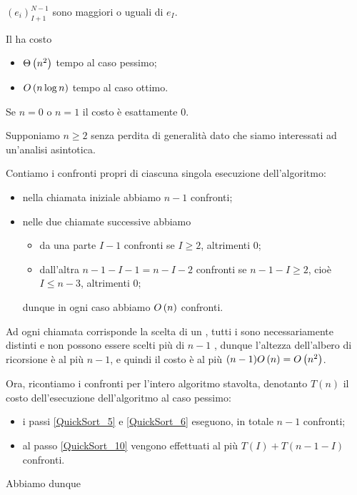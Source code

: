 $(e_i)_{I + 1}^{N - 1}$
sono maggiori o uguali di $e_I$. \EndProof
\begin{Theorem}
  \label{AlgoritmiEStruttureDiDati_CostoQuickSortDeterministico}
	Il  ha costo
  \begin{itemize}
    \item $\Theta \left ( n^2 \right )$ tempo al caso
      pessimo;
    \item $O \left ( n \log n \right )$ tempo al caso
      ottimo.
  \end{itemize}
\end{Theorem}
\Proof Se $n = 0$ o $n = 1$ il costo \`e esattamente $0$.
\par Supponiamo $n \geq 2$ senza perdita di generalit\`a dato che
siamo interessati ad un'analisi asintotica.
\par Contiamo i confronti propri di ciascuna singola esecuzione dell'algoritmo:
\begin{itemize}
  \item nella chiamata iniziale abbiamo $n - 1$ confronti;
  \item nelle due chiamate successive abbiamo
      \begin{itemize}
        \item da una parte $I - 1$ confronti se $I \geq 2$, altrimenti $0$;
        \item dall'altra $n - 1 - I - 1 = n - I - 2$ confronti se
          $n - 1 - I \geq 2$, cio\`e $I \leq n - 3$, altrimenti $0$;
      \end{itemize}
      dunque in ogni caso abbiamo $O \left ( n \right )$ confronti.
\end{itemize}
\par Ad ogni chiamata corrisponde la scelta di un ,
tutti i  sono necessariamente distinti e
non possono essere scelti pi\`u di $n - 1$ , dunque
l'altezza dell'albero di ricorsione \`e al pi\`u $n - 1$, e quindi il costo
\`e al pi\`u $(n - 1) O \left ( n \right ) = O \left ( n^2 \right )$.
\par Ora, ricontiamo i confronti per l'intero algoritmo stavolta, denotanto
$T(n)$ il costo dell'esecuzione dell'algoritmo al caso pessimo:
\begin{itemize}
  \item i passi \ref{QuickSort_5} e \ref{QuickSort_6} eseguono, in totale
    $n - 1$ confronti;
  \item al passo \ref{QuickSort_10} vengono effettuati al pi\`u
    $T(I) + T(n - 1 - I)$ confronti.
\end{itemize}
\par Abbiamo dunque
